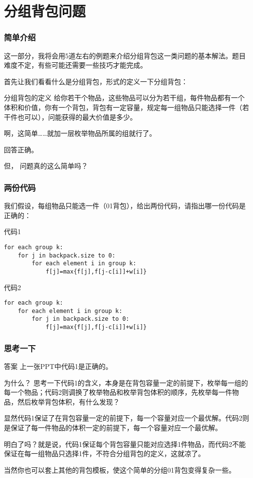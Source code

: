 \documentclass[UTF-8,aspectratio=1610]{ctexbeamer}
\begin{document}
\section{分组背包问题}
\begin{frame}
\frametitle{简单介绍}
这一部分，我将会用5道左右的例题来介绍分组背包这一类问题的基本解法。题目难度不定，有些可能还需要一些技巧才能完成。\pause

首先让我们看看什么是分组背包，形式的定义一下分组背包：\pause
\begin{alertblock}{分组背包的定义}
给你若干个物品，这些物品可以分为若干组，每件物品都有一个体积和价值，你有一个背包，背包有一定容量，规定每一组物品只能选择一件（若干件也可以），问能获得的最大价值是多少。
\end{alertblock}\pause
啊，这简单……就加一层枚举物品所属的组就行了。\pause

回答正确。\pause

但，\pause
问题真的这么简单吗？
\end{frame}
\begin{frame}[fragile]
\frametitle{两份代码}
我们假设，每组物品只能选一件（01背包），给出两份代码，请指出哪一份代码是正确的：\pause
\begin{exampleblock}{代码1}
\begin{verbatim}
for each group k:
    for j in backpack.size to 0:
        for each element i in group k:
            f[j]=max{f[j],f[j-c[i]]+w[i]}
\end{verbatim}
\end{exampleblock}\pause
\begin{exampleblock}{代码2}
\begin{verbatim}
for each group k:
    for each element i in group k:
        for j in backpack.size to 0:
            f[j]=max{f[j],f[j-c[i]]+w[i]}
\end{verbatim}
\end{exampleblock}
\end{frame}
\begin{frame}
\frametitle{思考一下}
\pause
\begin{exampleblock}{答案}
上一张PPT中代码1是正确的。
\end{exampleblock}
\pause
\begin{alertblock}{为什么？}
思考一下代码1的含义，本身是在背包容量一定的前提下，枚举每一组的每一个物品；代码2则调换了枚举物品和枚举背包体积的顺序，先枚举每一件物品，然后枚举背包体积，有什么发现？\pause

显然代码1保证了在背包容量一定的前提下，每一个容量对应一个最优解。代码2则是保证了每一件物品的体积一定的前提下，每一个容量对应一个最优解。\pause

明白了吗？就是说，代码1保证每个背包容量只能对应选择1件物品，而代码2不能保证在每一组物品只选择1件，不符合分组背包的定义，这就凉了。\pause

当然你也可以套上其他的背包模板，使这个简单的分组01背包变得复杂一些。
\end{alertblock}
\end{frame}
\end{document}
